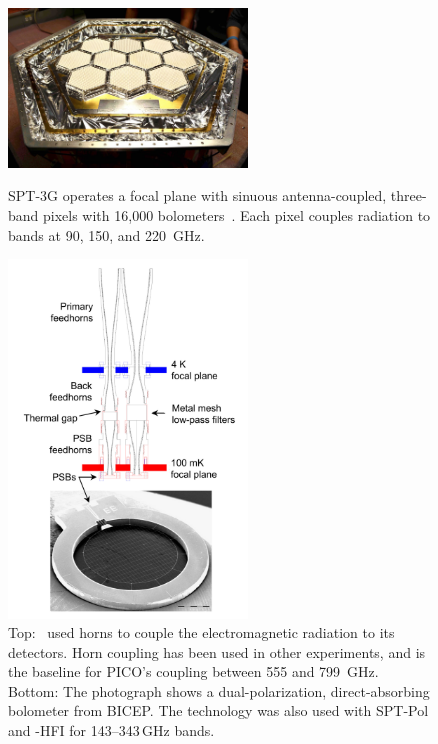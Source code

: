 \begin{figure}
\begin{minipage}[b]{0.475\textwidth}
  \begin{center}
  \includegraphics[width=2.5in]{figures/SPT3G.jpg} 
  \caption{\captiontext 
  SPT-3G operates a focal plane with sinuous antenna-coupled, three-band pixels with 16,000 bolometers~\citep{Dutcher2018}. Each pixel couples radiation to bands at 90, 150, and 220~GHz. 
  \label{fig:spt_fp} } 
  \end{center}
 \end{minipage}
 \hfill
  \begin{minipage}[b]{0.475\textwidth}
    \begin{center}
    \includegraphics[width=2.5in]{figures/DirectAbsorbing.png}
    \caption{\captiontext 
Top: \planck\ used horns to couple the electromagnetic radiation to its detectors. Horn coupling has been used in other experiments, and is the baseline for PICO's coupling between 555 and 799~GHz. Bottom: The photograph shows a dual-polarization, direct-absorbing bolometer from BICEP. The technology was also used with SPT-Pol and \planck-HFI for 143--343\,GHz bands.
\label{fig:DirectAbsorbing} }
    \end{center}
  \end{minipage}
\end{figure}



